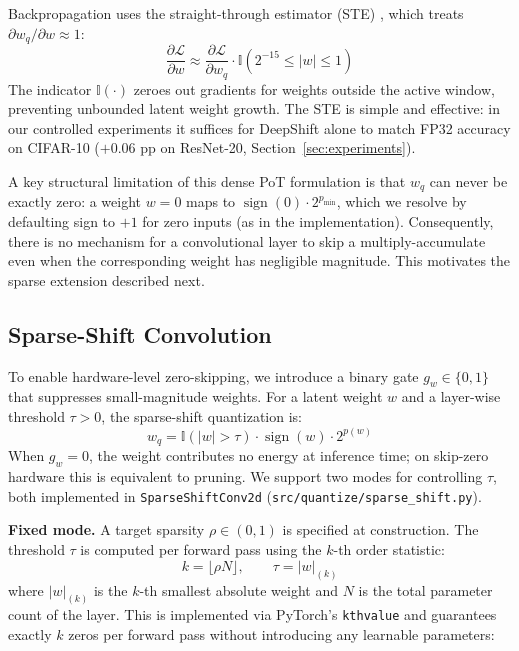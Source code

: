 \documentclass[12pt]{article}
\begin{document}
Backpropagation uses the straight-through estimator (STE) \cite{bengio2013ste}, which treats $\partial w_q/\partial w \approx 1$:
\begin{equation*}
    \frac{\partial \mathcal{L}}{\partial w} \approx \frac{\partial \mathcal{L}}{\partial w_q} \cdot \mathbb{I}(2^{-15} \le |w| \le 1)
\end{equation*}
The indicator $\mathbb{I}(\cdot)$ zeroes out gradients for weights outside the active window, preventing unbounded latent weight growth. The STE is simple and effective: in our controlled experiments it suffices for DeepShift alone to match FP32 accuracy on CIFAR-10 ($+0.06$ pp on ResNet-20, Section~\ref{sec:experiments}).

A key structural limitation of this dense PoT formulation is that $w_q$ can never be exactly zero: a weight $w=0$ maps to $\operatorname{sign}(0)\cdot 2^{p_{\min}}$, which we resolve by defaulting sign to $+1$ for zero inputs (as in the implementation). Consequently, there is no mechanism for a convolutional layer to skip a multiply-accumulate even when the corresponding weight has negligible magnitude. This motivates the sparse extension described next.

\subsection{Sparse-Shift Convolution}

To enable hardware-level zero-skipping, we introduce a binary gate $g_w \in \{0,1\}$ that suppresses small-magnitude weights. For a latent weight $w$ and a layer-wise threshold $\tau > 0$, the sparse-shift quantization is:
\begin{equation*}
    w_q = \mathbb{I}(|w|>\tau)\cdot \operatorname{sign}(w)\cdot 2^{p(w)}
\end{equation*}
When $g_w = 0$, the weight contributes no energy at inference time; on skip-zero hardware this is equivalent to pruning. We support two modes for controlling $\tau$, both implemented in \texttt{SparseShiftConv2d} (\texttt{src/quantize/sparse\_shift.py}).

\textbf{Fixed mode.} A target sparsity $\rho \in (0,1)$ is specified at construction. The threshold $\tau$ is computed per forward pass using the $k$-th order statistic:
\begin{equation*}
    k = \lfloor \rho N \rfloor, \qquad \tau = |w|_{(k)}
\end{equation*}
where $|w|_{(k)}$ is the $k$-th smallest absolute weight and $N$ is the total parameter count of the layer. This is implemented via PyTorch's \texttt{kthvalue} and guarantees exactly $k$ zeros per forward pass without introducing any learnable parameters:
\end{document}
